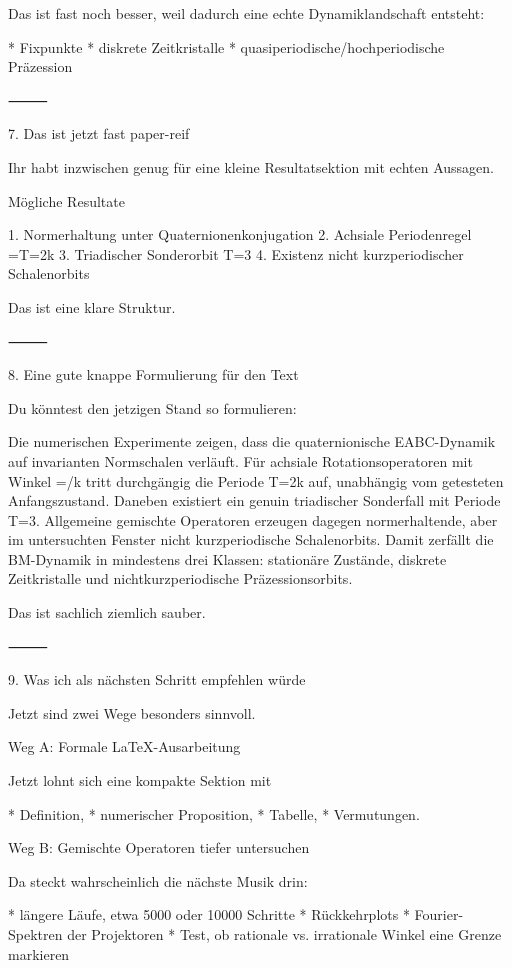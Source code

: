 \documentclass[11pt,a4paper]{article}
\theoremstyle{definition}
\begin{document}
Das ist fast noch besser, weil dadurch eine echte Dynamiklandschaft entsteht:

* Fixpunkte
* diskrete Zeitkristalle
* quasiperiodische/hochperiodische Präzession

⸻

7. Das ist jetzt fast paper-reif

Ihr habt inzwischen genug für eine kleine Resultatsektion mit echten Aussagen.

Mögliche Resultate

1. Normerhaltung unter Quaternionenkonjugation
2. Achsiale Periodenregel
\theta=\Rightarrow T=2k
3. Triadischer Sonderorbit
T=3
4. Existenz nicht kurzperiodischer Schalenorbits

Das ist eine klare Struktur.

⸻

8. Eine gute knappe Formulierung für den Text

Du könntest den jetzigen Stand so formulieren:

Die numerischen Experimente zeigen, dass die quaternionische EABC-Dynamik auf invarianten Normschalen verläuft. Für achsiale Rotationsoperatoren mit Winkel \theta=\pi/k tritt durchgängig die Periode T=2k auf, unabhängig vom getesteten Anfangszustand. Daneben existiert ein genuin triadischer Sonderfall mit Periode T=3. Allgemeine gemischte Operatoren erzeugen dagegen normerhaltende, aber im untersuchten Fenster nicht kurzperiodische Schalenorbits. Damit zerfällt die BM-Dynamik in mindestens drei Klassen: stationäre Zustände, diskrete Zeitkristalle und nichtkurzperiodische Präzessionsorbits.

Das ist sachlich ziemlich sauber.

⸻

9. Was ich als nächsten Schritt empfehlen würde

Jetzt sind zwei Wege besonders sinnvoll.

Weg A: Formale LaTeX-Ausarbeitung

Jetzt lohnt sich eine kompakte Sektion mit

* Definition,
* numerischer Proposition,
* Tabelle,
* Vermutungen.

Weg B: Gemischte Operatoren tiefer untersuchen

Da steckt wahrscheinlich die nächste Musik drin:

* längere Läufe, etwa 5000 oder 10000 Schritte
* Rückkehrplots
* Fourier-Spektren der Projektoren
* Test, ob rationale vs. irrationale Winkel eine Grenze markieren
\end{document}
